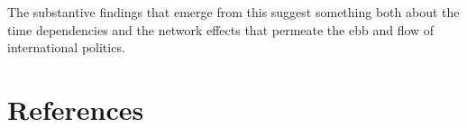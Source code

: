 \documentclass[3p,times,twocolumn,authoryear,12pt]{elsarticle}
\begin{document}
The substantive findings that emerge from this suggest something both about the time dependencies and the network effects that permeate the ebb and flow of international politics. 






\section*{References}
%  


\end{document}
